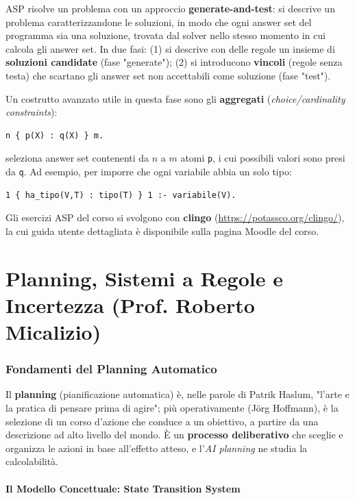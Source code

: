 \documentclass[a4paper,11pt]{article}
\begin{document}
ASP risolve un problema con un approccio \textbf{generate-and-test}: si descrive un problema caratterizzandone le soluzioni, in modo che ogni answer set del programma sia una soluzione, trovata dal solver nello stesso momento in cui calcola gli answer set. In due fasi: (1) si descrive con delle regole un insieme di \textbf{soluzioni candidate} (fase "generate"); (2) si introducono \textbf{vincoli} (regole senza testa) che scartano gli answer set non accettabili come soluzione (fase "test").

Un costrutto avanzato utile in questa fase sono gli \textbf{aggregati} (\emph{choice/cardinality constraints}):
\begin{lstlisting}
n { p(X) : q(X) } m.
\end{lstlisting}
seleziona answer set contenenti da $n$ a $m$ atomi \texttt{p}, i cui possibili valori sono presi da \texttt{q}. Ad esempio, per imporre che ogni variabile abbia un solo tipo:
\begin{lstlisting}
1 { ha_tipo(V,T) : tipo(T) } 1 :- variabile(V).
\end{lstlisting}

Gli esercizi ASP del corso si svolgono con \textbf{clingo} (\url{https://potassco.org/clingo/}), la cui guida utente dettagliata è disponibile sulla pagina Moodle del corso.

\newpage
\part{Planning, Sistemi a Regole e Incertezza (Prof. Roberto Micalizio)}

\section{Fondamenti del Planning Automatico}

Il \textbf{planning} (pianificazione automatica) è, nelle parole di Patrik Haslum, "l'arte e la pratica di pensare prima di agire"; più operativamente (Jörg Hoffmann), è la selezione di un corso d'azione che conduce a un obiettivo, a partire da una descrizione ad alto livello del mondo. È un \textbf{processo deliberativo} che sceglie e organizza le azioni in base all'effetto atteso, e l'\emph{AI planning} ne studia la calcolabilità.

\subsection{Il Modello Concettuale: State Transition System}
\end{document}
